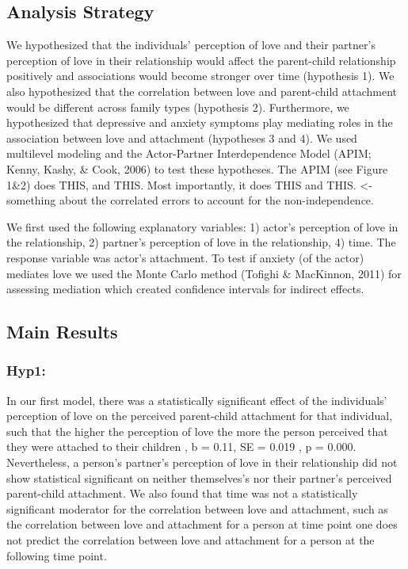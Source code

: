 \documentclass[man]{apa6}
\begin{document}
\hypertarget{analysis-strategy}{%
\subsection{Analysis Strategy}\label{analysis-strategy}}

We hypothesized that the individuals' perception of love and their partner's perception of love in their relationship would affect the parent-child relationship positively and associations would become stronger over time (hypothesis 1). We also hypothesized that the correlation between love and parent-child attachment would be different across family types (hypothesis 2). Furthermore, we hypothesized that depressive and anxiety symptoms play mediating roles in the association between love and attachment (hypotheses 3 and 4). We used multilevel modeling and the Actor-Partner Interdependence Model (APIM; Kenny, Kashy, \& Cook, 2006) to test these hypotheses. The APIM (see Figure 1\&2) does THIS, and THIS. Most importantly, it does THIS and THIS. \textless{}- something about the correlated errors to account for the non-independence.

We first used the following explanatory variables: 1) actor's perception of love in the relationship, 2) partner's perception of love in the relationship, 4) time. The response variable was actor's attachment. To test if anxiety (of the actor) mediates love we used the Monte Carlo method (Tofighi \& MacKinnon, 2011) for assessing mediation which created confidence intervals for indirect effects.

\hypertarget{main-results}{%
\subsection{Main Results}\label{main-results}}

\hypertarget{hyp1}{%
\subsubsection{Hyp1:}\label{hyp1}}

In our first model, there was a statistically significant effect of the individuals' perception of love on the perceived parent-child attachment for that individual, such that the higher the perception of love the more the person perceived that they were attached to their children , b = 0.11, SE = 0.019 , p = 0.000. Nevertheless, a person's partner's perception of love in their relationship did not show statistical significant on neither themselves's nor their partner's perceived parent-child attachment. We also found that time was not a statistically significant moderator for the correlation between love and attachment, such as the correlation between love and attachment for a person at time point one does not predict the correlation between love and attachment for a person at the following time point.
\end{document}
